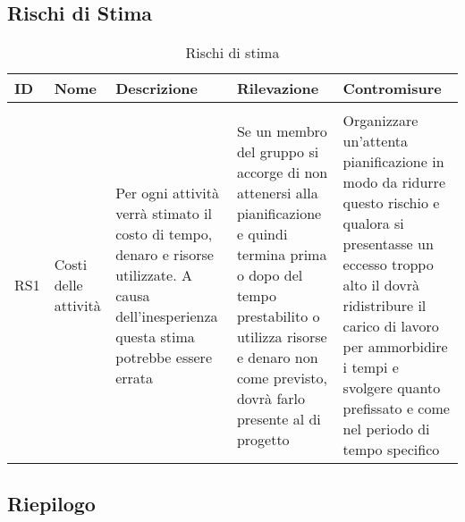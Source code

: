     \pagebreak
    
\subsection{Rischi di Stima}

\begin{center}
    \renewcommand{\arraystretch}{2.2}
    
    \begin{longtable}{p{} p{} p{} p{} p{} }
        
        \rowcolor[HTML]{232f3e}
    
        \rowcolors{3}{tableRow}{}
        \color[HTML]{FFFFFF} \textbf{ID} & \color[HTML]{FFFFFF} \textbf{Nome} & \color[HTML]{FFFFFF} \centering\textbf{Descrizione} & \color[HTML]{FFFFFF} \textbf{Rilevazione} & \color[HTML]{FFFFFF} \textbf{Contromisure} \\
    \endhead
    \rowcolor{white}\multicolumn{3}{c}{ Continua nella pagina successiva} \\
   \endfoot
   \caption{Rischi di stima}
        \label{tab:stima}
   \endlastfoot
    RS1 & Costi delle attività & Per ogni attività verrà stimato il costo di tempo, denaro e risorse utilizzate. A causa dell'inesperienza questa stima potrebbe essere errata & Se un membro del gruppo si accorge di non attenersi alla pianificazione e quindi termina prima o dopo del tempo prestabilito o utilizza risorse e denaro non come previsto, dovrà farlo presente al \roleProjectManager{} di progetto & Organizzare un'attenta pianificazione in modo da ridurre questo rischio e qualora si presentasse un eccesso troppo alto il \roleProjectManager{} dovrà ridistribure il carico di lavoro per ammorbidire i tempi e svolgere quanto prefissato e come nel periodo di tempo specifico \\
    
    
    \end{longtable}
    
    \end{center}


\subsection{Riepilogo}

